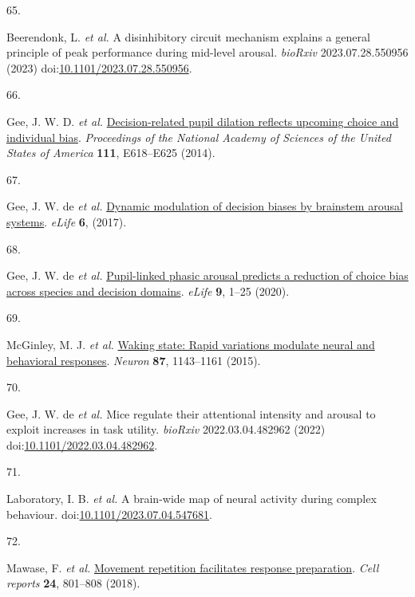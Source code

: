 \documentclass[
]{article}
\newlength{\cslhangindent}
\newlength{\csllabelwidth}
\newlength{\cslentryspacingunit} %
\newenvironment{CSLReferences}[2] %
 {%
  \setlength{\parindent}{0pt}
  \ifodd #1
  \let\oldpar\par
  \def\par{\hangindent=\cslhangindent\oldpar}
  \fi
  \setlength{\parskip}{#2\cslentryspacingunit}
 }%
 {}
\newcommand{\CSLLeftMargin}[1]{\parbox[t]{\csllabelwidth}{#1}}
\newcommand{\CSLRightInline}[1]{\parbox[t]{\linewidth - \csllabelwidth}{#1}\break}
\begin{document}
\begin{CSLReferences}{0}{0}
\leavevmode{}%
\CSLLeftMargin{65. }%
\CSLRightInline{Beerendonk, L. \emph{et al.} A disinhibitory circuit
mechanism explains a general principle of peak performance during
mid-level arousal. \emph{bioRxiv} 2023.07.28.550956 (2023)
doi:\href{https://doi.org/10.1101/2023.07.28.550956}{10.1101/2023.07.28.550956}.}

\leavevmode{}%
\CSLLeftMargin{66. }%
\CSLRightInline{Gee, J. W. D. \emph{et al.}
\href{https://doi.org/10.1073/PNAS.1317557111/SUPPL_FILE/PNAS.201317557SI.PDF}{Decision-related
pupil dilation reflects upcoming choice and individual bias}.
\emph{Proceedings of the National Academy of Sciences of the United
States of America} \textbf{111}, E618--E625 (2014).}

\leavevmode{}%
\CSLLeftMargin{67. }%
\CSLRightInline{Gee, J. W. de \emph{et al.}
\href{https://doi.org/10.7554/ELIFE.23232}{Dynamic modulation of
decision biases by brainstem arousal systems}. \emph{eLife} \textbf{6},
(2017).}

\leavevmode{}%
\CSLLeftMargin{68. }%
\CSLRightInline{Gee, J. W. de \emph{et al.}
\href{https://doi.org/10.7554/ELIFE.54014}{Pupil-linked phasic arousal
predicts a reduction of choice bias across species and decision
domains}. \emph{eLife} \textbf{9}, 1--25 (2020).}

\leavevmode{}%
\CSLLeftMargin{69. }%
\CSLRightInline{McGinley, M. J. \emph{et al.}
\href{https://doi.org/10.1016/j.neuron.2015.09.012}{Waking state: Rapid
variations modulate neural and behavioral responses}. \emph{Neuron}
\textbf{87}, 1143--1161 (2015).}

\leavevmode{}%
\CSLLeftMargin{70. }%
\CSLRightInline{Gee, J. W. de \emph{et al.} Mice regulate their
attentional intensity and arousal to exploit increases in task utility.
\emph{bioRxiv} 2022.03.04.482962 (2022)
doi:\href{https://doi.org/10.1101/2022.03.04.482962}{10.1101/2022.03.04.482962}.}

\leavevmode{}%
\CSLLeftMargin{71. }%
\CSLRightInline{Laboratory, I. B. \emph{et al.} A brain-wide map of
neural activity during complex behaviour.
doi:\href{https://doi.org/10.1101/2023.07.04.547681}{10.1101/2023.07.04.547681}.}

\leavevmode{}%
\CSLLeftMargin{72. }%
\CSLRightInline{Mawase, F. \emph{et al.}
\href{https://doi.org/10.1016/J.CELREP.2018.06.097}{Movement repetition
facilitates response preparation}. \emph{Cell reports} \textbf{24},
801--808 (2018).}


\end{CSLReferences}
\end{document}
